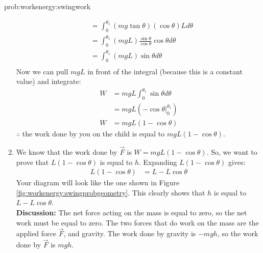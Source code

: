 \begin{solution}{prob:workenergy:swingwork}
\begin{enumerate}[label=\alph*)]
\begin{align*}
&=\int_0^{\theta_1}(mg\tan\theta)(\cos\theta)Ld\theta\\
&=\int_0^{\theta_1}(mgL)\frac{\sin\theta}{\cos\theta}\cos\theta d\theta\\
&=\int_0^{\theta_1}(mgL)\sin\theta d\theta\\
\end{align*}
Now we can pull $mgL$ in front of the integral (because this is a constant value) and integrate: 
\begin{align*}
W&=mgL\int_0^{\theta_1}\sin\theta d\theta\\
&=mgL(-\cos\theta\vert_0^{\theta_1})\\
W&=mgL(1-\cos\theta)
\end{align*}
$\therefore$ the work done by you on the child is equal to $mgL(1-\cos\theta)$. 
\item We know that the work done by $\vec F$ is $W=mgL(1-\cos\theta)$. So, we want to prove that $L(1-\cos\theta)$ is equal to $h$. Expanding $L(1-\cos\theta)$ gives:
\begin{align*}
L(1-\cos\theta)&=L-L\cos\theta
\end{align*}
Your diagram will look like the one shown in Figure \ref{fig:workenergy:swingprobgeometry}. 
This clearly shows that $h$ is equal to $L-L\cos\theta$.\\

\textbf{Discussion:} The net force acting on the mass is equal to zero, so the net work must be equal to zero. The two forces that do work on the mass are the applied force $\vec F$, and gravity. The work done by gravity is $-mgh$, so the work done by $\vec F$ is $mgh$. 
\end{enumerate}
\end{solution}

